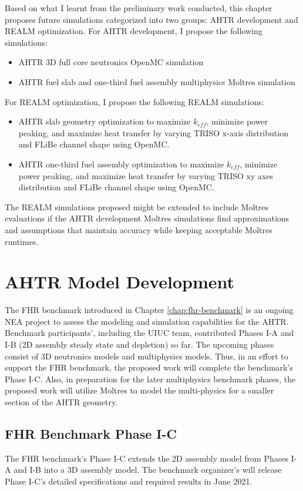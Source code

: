 Based on what I learnt from the preliminary work conducted, this chapter proposes 
future simulations categorized into two groups: \gls{AHTR} development and 
\gls{REALM} optimization. 
For \gls{AHTR} development, I propose the following simulations: 
\begin{itemize}
    \item \gls{AHTR} 3D full core neutronics OpenMC simulation
    \item \gls{AHTR} fuel slab and one-third fuel assembly multiphysics 
    Moltres simulation
\end{itemize}
For \gls{REALM} optimization, I propose the following \gls{REALM} simulations: 
\begin{itemize}
    \item \gls{AHTR} slab geometry optimization to maximize $k_{eff}$, 
    minimize power peaking, and maximize heat transfer by varying \gls{TRISO} 
    x-axis distribution and \gls{FLiBe} channel shape using OpenMC. 
    \item \gls{AHTR} one-third fuel assembly optimization to maximize $k_{eff}$, 
    minimize power peaking, and maximize heat transfer by varying \gls{TRISO} 
    xy axes distribution and \gls{FLiBe} channel shape using OpenMC.
\end{itemize}
The \gls{REALM} simulations proposed might be extended to include Moltres 
evaluations if the \gls{AHTR} development Moltres simulations find approximations 
and assumptions that maintain accuracy while keeping acceptable Moltres runtimes.

\section{AHTR Model Development}
The \gls{FHR} benchmark introduced in Chapter \ref{chap:fhr-benchmark} is an 
ongoing \gls{NEA} project to assess the modeling and simulation capabilities 
for the \gls{AHTR}. 
Benchmark participants', including the \gls{UIUC} team, contributed Phases I-A 
and I-B (2D assembly steady state and depletion) so far.  
The upcoming phases consist of 3D neutronics models and multiphysics models. 
Thus, in an effort to support the \gls{FHR} benchmark, the proposed work will 
complete the benchmark's Phase I-C.
Also, in preparation for the later multiphysics benchmark phases, the proposed 
work will utilize Moltres to model the multi-physics for a smaller section of 
the \gls{AHTR} geometry. 

\subsection{FHR Benchmark Phase I-C}
The \gls{FHR} benchmark's Phase I-C extends the 2D assembly model from Phases 
I-A and I-B into a 3D assembly model. 
The benchmark organizer's will release Phase I-C's detailed specifications and 
required results in June 2021.

